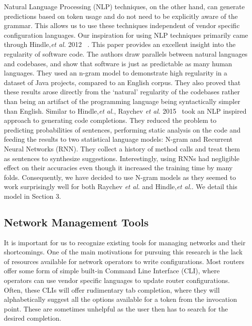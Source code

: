 Natural Language Processing (NLP) techniques, on the other hand, can generate predictions based on token usage and do not need to be explicitly aware of the grammar. This allows us to use these techniques independent of vendor specific configuration languages. Our inspiration for using NLP techniques primarily came through Hindle,\textit{et al.} 2012 ~\cite{naturalness}. This paper provides an excellent insight into the regularity of software code. The authors draw parallels between natural languages and codebases, and show that software is just as predictable as many human languages. They used an n-gram model to demonstrate high regularity in a dataset of Java projects, compared to an English corpus. They also proved that these results arose directly from the ‘natural’ regularity of the codebases rather than being an artifact of the programming language being syntactically simpler than English. Similar to Hindle,\textit{et al.}, Raychev \textit{et al.} 2015~\cite{raychev} took an NLP inspired approach to generating code completions. They reduced the problem to predicting probabilities of sentences, performing static analysis on the code and feeding the results to two statistical language models: N-gram and Recurrent Neural Networks (RNN). They collect a history of method calls and treat them as sentences to synthesize suggestions. Interestingly, using RNNs had negligible effect on their accuracies even though it increased the training time by many folds. Consequently, we have decided to use N-gram models as they seemed to work surprisingly well for both Raychev \textit{et al.} and Hindle,\textit{et al.}. We detail this model in Section 3.

\subsection{Network Management Tools}

It is important for us to recognize existing tools for managing networks and their shortcomings. One of the main motivations for pursuing this research is the lack of resources available for network operators to write configurations. Most routers offer some form of simple built-in Command Line Interface (CLI), where operators can use vendor specific languages to update router configurations. Often, these CLIs will offer rudimentary tab completion, where they will alphabetically suggest all the options available for a token from the invocation point. These are sometimes unhelpful as the user then has to search for the desired completion.\\ 

